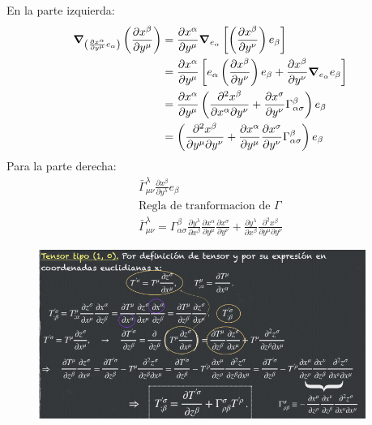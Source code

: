 \documentclass{article}
\begin{document}
En la parte izquierda: 
\begin{align*}
  \grad _{\left(\frac{\partial x ^ {\alpha} }{\partial y ^ {\mu }}e_\alpha\right)} \left(\frac{\partial x ^ {\beta} }{\partial y ^ {\mu}}\right)  &= \frac{\partial x ^ {\alpha} }{\partial y ^ {\mu}}\grad _{e_\alpha} \left[\left(\frac{\partial x ^ {\beta} }{\partial y ^ {\nu}}\right)e _{\beta} \right] \\
  &= \frac{\partial x ^ {\alpha} }{\partial y ^ {\mu}} \left[e _{\alpha}  \left(\frac{\partial x ^ {\beta} }{\partial y ^ {\nu}}\right)e _{\beta} + \frac{\partial x ^ {\beta} }{\partial y ^ {\nu}}\grad _{e _{\alpha} } e _{\beta} \right]\\
  &= \frac{\partial x ^ {\alpha} }{\partial y ^ {\mu}} \left(\frac{\partial ^2 x ^ {\beta} }{\partial x ^ {\alpha}\partial y ^ {\nu}} + \frac{\partial x ^ {\sigma} }{\partial y ^ {\nu}}\Gamma _{\alpha\sigma} ^ {\beta}\right)e _{\beta} \\
  &= \left(\frac{\partial ^2 x ^ {\beta} }{\partial y ^ {\mu}\partial y ^ {\nu }} + \frac{\partial x^\alpha }{\partial y ^\mu}\frac{\partial x ^ {\sigma} }{\partial y ^ {\nu}}\Gamma _{\alpha\sigma} ^ {\beta}\right)e _{\beta} 
\end{align*}
Para la parte derecha: 
\begin{gather*}
  \bar \Gamma _{\mu\nu} ^ {\lambda} \frac{\partial x ^ {\beta} }{\partial y ^ {\lambda}}e _{\beta}  \\
  \text{Regla de tranformacion de }\Gamma \\
  \bar \Gamma _{\mu\nu} ^ {\lambda} = \Gamma _{\alpha\sigma} ^ {\beta} \frac{\partial y ^ {\lambda} }{\partial x ^ {\beta}} \frac{\partial x ^ {\alpha} }{\partial y ^ {\mu} } \frac{\partial x ^ {\sigma} }{\partial y ^ {\nu}} + \frac{\partial y ^ {\lambda} }{\partial x ^ {\beta}} \frac{\partial ^2 x ^ {\beta} }{\partial y ^ {\mu}\partial y ^ {\nu}}
\end{gather*}
\begin{figure}[H]
  \begin{center}
    \includegraphics[width=0.95\textwidth]{tensor10.png}
  \end{center}
\end{figure}
\end{document}
